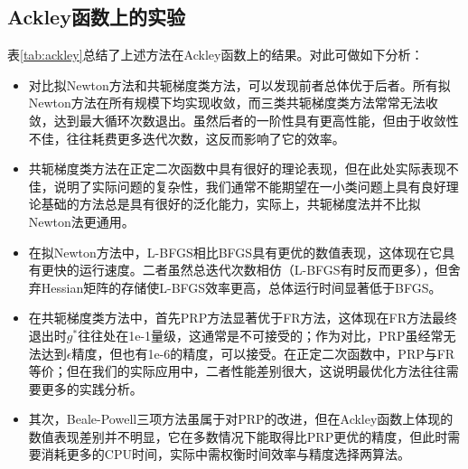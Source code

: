 \documentclass{article}
\begin{document}
\subsection{Ackley函数上的实验}
表\ref{tab:ackley}总结了上述方法在Ackley函数上的结果。对此可做如下分析：
\begin{itemize}
  \item 对比拟Newton方法和共轭梯度类方法，可以发现前者总体优于后者。所有拟Newton方法在所有规模下均实现收敛，而三类共轭梯度类方法常常无法收敛，达到最大循环次数退出。虽然后者的一阶性具有更高性能，但由于收敛性不佳，往往耗费更多迭代次数，这反而影响了它的效率。
  \item 共轭梯度类方法在正定二次函数中具有很好的理论表现，但在此处实际表现不佳，说明了实际问题的复杂性，我们通常不能期望在一小类问题上具有良好理论基础的方法总是具有很好的泛化能力，实际上，共轭梯度法并不比拟Newton法更通用。
  \item 在拟Newton方法中，L-BFGS相比BFGS具有更优的数值表现，这体现在它具有更快的运行速度。二者虽然总迭代次数相仿（L-BFGS有时反而更多），但舍弃Hessian矩阵的存储使L-BFGS效率更高，总体运行时间显著低于BFGS。
  \item 在共轭梯度类方法中，首先PRP方法显著优于FR方法，这体现在FR方法最终退出时$g^*$往往处在1e-1量级，这通常是不可接受的；作为对比，PRP虽经常无法达到$\epsilon$精度，但也有1e-6的精度，可以接受。在正定二次函数中，PRP与FR等价；但在我们的实际应用中，二者性能差别很大，这说明最优化方法往往需要更多的实践分析。
  \item 其次，Beale-Powell三项方法虽属于对PRP的改进，但在Ackley函数上体现的数值表现差别并不明显，它在多数情况下能取得比PRP更优的精度，但此时需要消耗更多的CPU时间，实际中需权衡时间效率与精度选择两算法。
\end{itemize}
\end{document}
